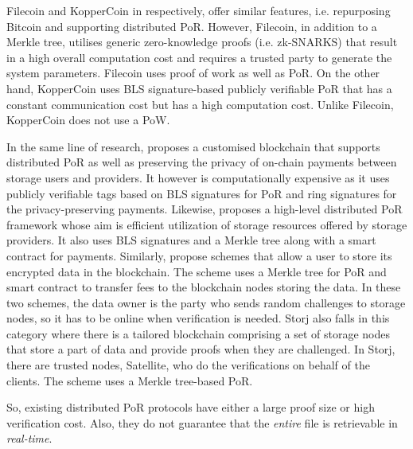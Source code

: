Filecoin and KopperCoin in \cite{Filecoin,KoppBK16} respectively, offer  similar features, i.e. repurposing Bitcoin and supporting distributed PoR.  However, Filecoin, in addition to a Merkle tree, utilises  generic zero-knowledge proofs (i.e. zk-SNARKS) that result in a high  overall computation  cost and requires a trusted party to generate the system parameters. Filecoin uses proof of work as well as PoR. On the other hand, 
 KopperCoin uses BLS signature-based publicly verifiable PoR that has a constant communication cost but has a high computation cost. Unlike Filecoin, KopperCoin does not use a PoW. 

In the same line of research, \cite{KoppMHKB17} proposes a customised blockchain  that supports distributed PoR as well as  preserving the privacy of on-chain payments between storage users and providers. It however is computationally expensive as it uses publicly verifiable  tags based on  BLS signatures for PoR and ring signatures for the privacy-preserving payments.  Likewise, \cite{RujRBK18} proposes a high-level distributed PoR framework whose aim is efficient utilization of  storage resources offered by storage providers. It also uses BLS signatures and a Merkle tree along with a smart contract  for payments. Similarly, \cite{XueX0B18,XueXB19} propose  schemes that allow a user to store its encrypted data in the blockchain. The scheme uses a Merkle tree  for PoR   and smart contract to transfer fees to the blockchain nodes storing  the data. In these two schemes, the data owner  is the party who sends random challenges  to  storage nodes, so it has to be  online when  verification is needed. Storj \cite{storj14} also falls in this category where there is a tailored blockchain comprising a set of storage nodes that store a part of data and provide  proofs when they are challenged. In Storj, there are trusted nodes, Satellite, who do the verifications on behalf of the clients.  The scheme uses a Merkle tree-based   PoR. 

So,  existing distributed PoR protocols have either a large proof size or  high verification cost. Also,  they do not guarantee  that the \emph{entire} file is retrievable in  \emph{real-time}. 



